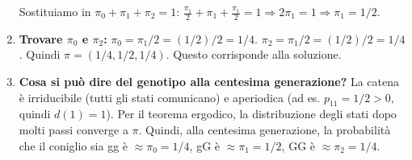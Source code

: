 \begin{example}
\begin{enumerate}
    Sostituiamo in $\pi_0 + \pi_1 + \pi_2 = 1$:
    $\frac{\pi_1}{2} + \pi_1 + \frac{\pi_1}{2} = 1 \Rightarrow 2\pi_1 = 1 \Rightarrow \pi_1 = 1/2$.
    \item \textbf{Trovare $\pi_0$ e $\pi_2$:}
    $\pi_0 = \pi_1/2 = (1/2)/2 = 1/4$.
    $\pi_2 = \pi_1/2 = (1/2)/2 = 1/4$.
    Quindi $\pi = (1/4, 1/2, 1/4)$. Questo corrisponde alla soluzione.
    \item \textbf{Cosa si può dire del genotipo alla centesima generazione?}
    La catena è irriducibile (tutti gli stati comunicano) e aperiodica (ad es. $p_{11}=1/2 > 0$, quindi $d(1)=1$). Per il teorema ergodico, la distribuzione degli stati dopo molti passi converge a $\pi$. Quindi, alla centesima generazione, la probabilità che il coniglio sia gg è $\approx \pi_0=1/4$, gG è $\approx \pi_1=1/2$, GG è $\approx \pi_2=1/4$.
\end{enumerate}
\end{example}

